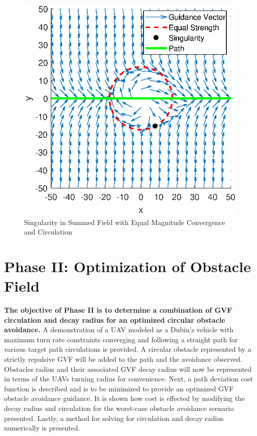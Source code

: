 \documentclass[numbered,pdftex]{ohio-etd}
\begin{document}
\begin{figure}
	\centering
	\includegraphics[width=12cm]{PaperFigures/Methods/summedFieldsCircSingularity}
	\caption{Singularity in Summed Field with Equal Magnitude Convergence and Circulation}
	\label{fig:summedfieldscircsingularity}
\end{figure}



\section{Phase II: Optimization of Obstacle Field}
\textbf{The objective of Phase II is to determine a combination of GVF circulation and decay radius for an optimized circular obstacle avoidance.} A demonstration of a UAV modeled as a Dubin's vehicle with maximum turn rate constraints converging and following a straight path for various target path circulations is provided. A circular obstacle represented by a strictly repulsive GVF will be added to the path and the avoidance observed. Obstacles radius and their associated GVF decay radius will now be represented in terms of the UAVs turning radius for convenience. Next, a path deviation cost function is described and is to be minimized to provide an optimized GVF obstacle avoidance guidance. It is shown how cost is effected by modifying the decay radius and circulation for the worst-case obstacle avoidance scenario presented. Lastly, a method for solving for circulation and decay radius numerically is presented. 
\end{document}
